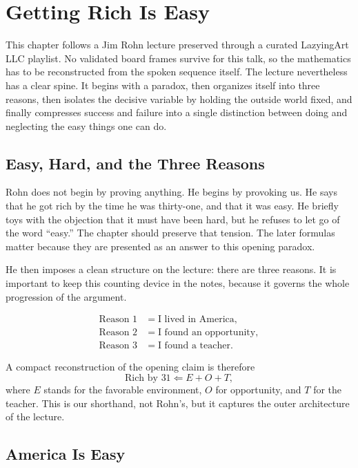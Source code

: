 \chapter{Getting Rich Is Easy}

This chapter follows a Jim Rohn lecture preserved through a curated LazyingArt LLC playlist. No validated board frames survive for this talk, so the mathematics has to be reconstructed from the spoken sequence itself. The lecture nevertheless has a clear spine. It begins with a paradox, then organizes itself into three reasons, then isolates the decisive variable by holding the outside world fixed, and finally compresses success and failure into a single distinction between doing and neglecting the easy things one can do.

\section{Easy, Hard, and the Three Reasons}

Rohn does not begin by proving anything. He begins by provoking us. He says that he got rich by the time he was thirty-one, and that it was easy. He briefly toys with the objection that it must have been hard, but he refuses to let go of the word ``easy.'' The chapter should preserve that tension. The later formulas matter because they are presented as an answer to this opening paradox.

He then imposes a clean structure on the lecture: there are three reasons. It is important to keep this counting device in the notes, because it governs the whole progression of the argument.

\begin{align}
\text{Reason 1} &= \text{I lived in America},\\
\text{Reason 2} &= \text{I found an opportunity},\\
\text{Reason 3} &= \text{I found a teacher}.
\end{align}

A compact reconstruction of the opening claim is therefore
\begin{equation}
\text{Rich by }31 \Longleftarrow E + O + T,
\end{equation}
where \(E\) stands for the favorable environment, \(O\) for opportunity, and \(T\) for the teacher. This is our shorthand, not Rohn's, but it captures the outer architecture of the lecture.

\section{America Is Easy}

